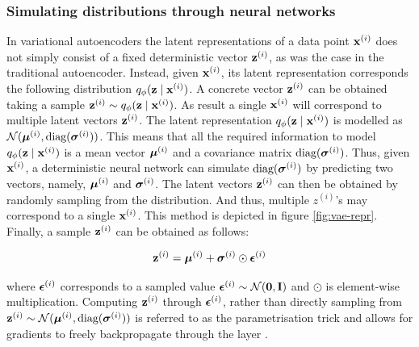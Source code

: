 \subsubsection{Simulating distributions through neural networks}
In variational autoencoders the latent representations of a data point $\mathbf{x}^{(i)}$ does not simply consist of a fixed deterministic vector $\mathbf{z}^{(i)}$, as was the case in the traditional autoencoder. Instead, given $\mathbf{x}^{(i)}$, its latent representation corresponds the following distribution $q_\phi (\mathbf{z} \mid \mathbf{x}^{(i)})$.
A concrete vector $\mathbf{z}^{(i)}$ can be obtained taking a sample $\mathbf{z}^{(i)} \sim q_\phi (\mathbf{z} \mid \mathbf{x}^{(i)})$. As result a single $\mathbf{x}^{(i)}$ will correspond to multiple latent vectors $\mathbf{z}^{(i)}$. The latent representation $q_\phi (\mathbf{z} \mid \mathbf{x}^{(i)})$ is modelled as $\mathcal{N}(\bm{\mu}^{(i)}, \text{diag}(\bm{\sigma}^{(i)}))$. This means that all the required information to model $q_\phi (\mathbf{z} \mid \mathbf{x}^{(i)})$ is a mean vector $\bm{\mu}^{(i)}$ and a covariance matrix $\text{diag}(\bm{\sigma}^{(i)})$. Thus, given $\mathbf{x}^{(i)}$, a deterministic neural network can simulate $\text{diag}(\bm{\sigma}^{(i)})$ by predicting two vectors, namely, $\bm{\mu}^{(i)}$ and $\bm{\sigma}^{(i)}$. The latent vectors $\mathbf{z}^{(i)}$ can then be obtained by randomly sampling from the distribution. And thus, multiple $z^{(i)}$'s may correspond to a single $\mathbf{x}^{(i)}$. This method is depicted in figure \ref{fig:vae-repr}. Finally, a sample $\mathbf{z}^{(i)}$ can be obtained as follows:

\begin{equation}
\mathbf{z}^{(i)} = \bm{\mu}^{(i)} + \bm{\sigma}^{(i)} \odot \bm{\epsilon}^{(i)}
\end{equation}

where $\bm{\epsilon}^{(i)}$ corresponds to a sampled value $\bm{\epsilon}^{(i)} \sim \mathcal{N}(\bm{\mathbf{0}}, \mathbf{I})$ and $\odot$ is element-wise multiplication. Computing $\mathbf{z}^{(i)}$ through $\bm{\epsilon}^{(i)}$, rather than directly sampling from $\mathbf{z}^{(i)} \sim \mathcal{N}(\bm{\mu}^{(i)}, \text{diag}(\bm{\sigma}^{(i)}))$ is referred to as the parametrisation trick and allows for gradients to freely backpropagate through the layer \cite{davidfosterVariationalAutoencoders2023}.


